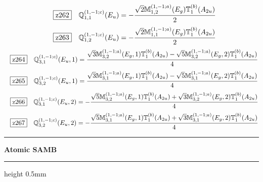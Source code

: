 \documentclass[fleqn,10pt,landscape]{jsarticle}
\begin{document}
\begin{dmath*}
\hspace*{3mm}\fbox{z262}\quad \mathbb{Q}_{1,1}^{(1,-1;c)}(E_{u})=- \frac{\sqrt{2} \mathbb{M}_{1,2}^{(1,-1;a)}(E_{g}) \mathbb{T}_{1}^{(b)}(A_{2u})}{2}
\end{dmath*}
\begin{dmath*}
\hspace*{3mm}\fbox{z263}\quad \mathbb{Q}_{1,2}^{(1,-1;c)}(E_{u})=- \frac{\sqrt{2} \mathbb{M}_{1,1}^{(1,-1;a)}(E_{g}) \mathbb{T}_{1}^{(b)}(A_{2u})}{2}
\end{dmath*}
\begin{dmath*}
\hspace*{3mm}\fbox{z264}\quad \mathbb{Q}_{3,1}^{(1,-1;c)}(E_{u},1)=\frac{\sqrt{3} \mathbb{M}_{3,2}^{(1,-1;a)}(E_{g},1) \mathbb{T}_{1}^{(b)}(A_{2u}) - \sqrt{5} \mathbb{M}_{3,2}^{(1,-1;a)}(E_{g},2) \mathbb{T}_{1}^{(b)}(A_{2u})}{4}
\end{dmath*}
\begin{dmath*}
\hspace*{3mm}\fbox{z265}\quad \mathbb{Q}_{3,2}^{(1,-1;c)}(E_{u},1)=\frac{\sqrt{3} \mathbb{M}_{3,1}^{(1,-1;a)}(E_{g},1) \mathbb{T}_{1}^{(b)}(A_{2u}) - \sqrt{5} \mathbb{M}_{3,1}^{(1,-1;a)}(E_{g},2) \mathbb{T}_{1}^{(b)}(A_{2u})}{4}
\end{dmath*}
\begin{dmath*}
\hspace*{3mm}\fbox{z266}\quad \mathbb{Q}_{3,1}^{(1,-1;c)}(E_{u},2)=- \frac{\sqrt{5} \mathbb{M}_{3,2}^{(1,-1;a)}(E_{g},1) \mathbb{T}_{1}^{(b)}(A_{2u}) + \sqrt{3} \mathbb{M}_{3,2}^{(1,-1;a)}(E_{g},2) \mathbb{T}_{1}^{(b)}(A_{2u})}{4}
\end{dmath*}
\begin{dmath*}
\hspace*{3mm}\fbox{z267}\quad \mathbb{Q}_{3,2}^{(1,-1;c)}(E_{u},2)=- \frac{\sqrt{5} \mathbb{M}_{3,1}^{(1,-1;a)}(E_{g},1) \mathbb{T}_{1}^{(b)}(A_{2u}) + \sqrt{3} \mathbb{M}_{3,1}^{(1,-1;a)}(E_{g},2) \mathbb{T}_{1}^{(b)}(A_{2u})}{4}
\end{dmath*}
\vspace{5mm}

\vspace{5mm}
\noindent \rule[0.5mm]{5mm}{0.5mm}\hspace{3mm}\textbf{Atomic SAMB}\hspace{3mm}\leaders\hrule height 0.5mm\hfill\kern0pt
\vspace{3mm}

\vspace{5mm}
\end{document}
